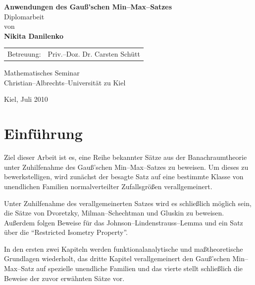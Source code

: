 \documentclass[a4paper]{report}
\numberwithin[\roman]{equation}{sat}
\begin{document}
\begin{titlepage}

\hypertarget{titlepage}{}

\begin{center}
{ \huge \textbf{Anwendungen des Gauß'schen Min--Max--Satzes}}\\[3cm]
\vspace*{3cm}
{\large
Diplomarbeit\\
von\\
{\textbf {Nikita Danilenko}} \\
}

\vspace*{\fill}

\begin{tabular}{rl}
Betreuung:& Priv.--Doz. Dr. Carsten Schütt\\
\end{tabular}
\end{center}
\vspace*{3cm}
\begin{center}
Mathematisches Seminar\\
Christian--Albrechts--Universität zu Kiel
\end{center}
\vspace*{3cm}
\begin{center}
Kiel, Juli 2010
\end{center}
\end{titlepage}

\tableofcontents

\chapter*{Einführung}

Ziel dieser Arbeit ist es, eine Reihe bekannter Sätze aus der Banachraumtheorie
unter Zuhilfenahme des Gauß'schen Min--Max--Satzes zu beweisen.
Um dieses zu bewerkstelligen, wird zunächst der besagte Satz auf eine bestimmte Klasse
von unendlichen Familien normalverteilter Zufallsgrößen verallgemeinert.

Unter Zuhilfenahme des verallgemeinerten Satzes wird es schließlich möglich
sein, die Sätze von Dvoretzky, Milman--Schechtman und Gluskin zu beweisen.
Außerdem folgen Beweise für das Johnson--Lindenstrauss--Lemma und ein
Satz über die \enquote{Restricted Isometry Property}.

In den ersten zwei Kapiteln werden funktionalanalytische und maßtheoretische
Grundlagen wiederholt, das dritte Kapitel verallgemeinert den Gauß'schen
Min--Max--Satz auf spezielle unendliche Familien und das vierte stellt
schließlich die Beweise der zuvor erwähnten Sätze vor.
\end{document}
